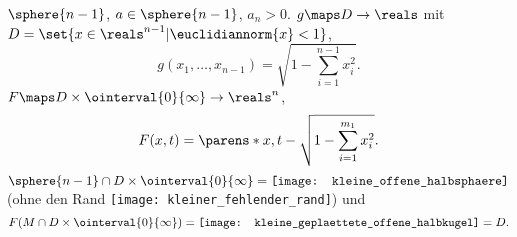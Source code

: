 \begin{beispiel*}
  \( \sphere{n-1} \), \( a\in \sphere{n-1} \), \( a_n>0 \). \( g\maps D\to \reals  \) mit \( D=\set{x\in \reals^{n-1}|\euclidiannorm{x}<1} \),
  \begin{equation*}
    g(x_1,\dotsc,x_{n-1})=\sqrt{1-\sum_{i=1}^{n-1}x_i^2}.
  \end{equation*}
  \( F\maps D\times \ointerval{0}{\infty}\to \reals^n \),
  \begin{equation*}
    F(x,t)=\parens*{x,t-\sqrt{1-\sum_{i=1}^{m_1}x_i^2}}.
  \end{equation*}
  \( \sphere{n-1}\cap D\times \ointerval{0}{\infty}=\texttt{[image: kleine\_offene\_halbsphaere]} \) (ohne den Rand \texttt{[image: kleiner\_fehlender\_rand]}) und %
  \begin{equation*}
    F(M\cap D\times \ointerval{0}{\infty})=\texttt{[image: kleine\_geplaettete\_offene\_halbkugel]}=D. %
  \end{equation*}
\end{beispiel*}

